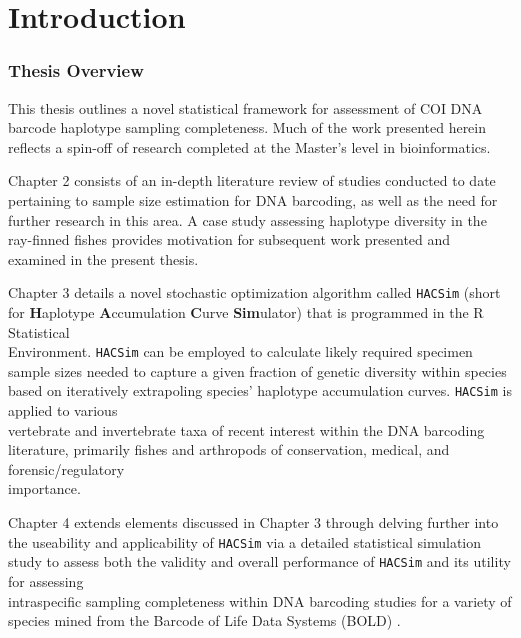 \linespread{1.0}

\chapter{Introduction}
\subsection{Thesis Overview} \label{sec:intro1}

This thesis outlines a novel statistical framework for assessment of COI DNA barcode haplotype sampling completeness. Much of the work presented herein reflects a spin-off of research completed at the Master's level in bioinformatics.

\vspace{5mm}

Chapter 2 consists of an in-depth literature review of studies conducted to date \\ pertaining to sample size estimation for DNA barcoding, as well as the need for further research in this area. A case study assessing haplotype diversity in the ray-finned fishes \cite{phillips2015exploration} provides motivation for subsequent work presented and examined in the present thesis. 

\vspace{5mm}

Chapter 3 details a novel stochastic optimization algorithm called {\tt HACSim} (short for \textbf{H}aplotype \textbf{A}ccumulation \textbf{C}urve \textbf{Sim}ulator) that is programmed in the R Statistical \\ Environment. {\tt HACSim} can be employed to calculate likely required specimen sample sizes needed to capture a given fraction of genetic diversity within species based on iteratively extrapoling species' haplotype accumulation curves. {\tt HACSim} is applied to various \\ vertebrate and invertebrate taxa of recent interest within the DNA barcoding literature, primarily fishes and arthropods of conservation, medical, and forensic/regulatory \\ importance.

\vspace{5mm}

Chapter 4 extends elements discussed in Chapter 3 through delving further into the useability and applicability of {\tt HACSim} via a detailed statistical simulation study to assess both the validity and overall performance of {\tt HACSim} and its utility for assessing \\ intraspecific sampling completeness within DNA barcoding studies for a variety of species mined from the Barcode of Life Data Systems (BOLD) \cite{ratnasingham2007bold}.

